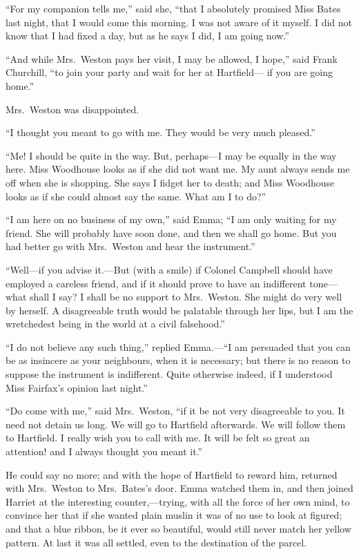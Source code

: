 ``For my companion tells me,'' said she, ``that I absolutely promised
Miss Bates last night, that I would come this morning.  I was
not aware of it myself.  I did not know that I had fixed a day,
but as he says I did, I am going now.''

``And while Mrs.\ Weston pays her visit, I may be allowed, I hope,''
said Frank Churchill, ``to join your party and wait for her at Hartfield---%
if you are going home.''

Mrs.\ Weston was disappointed.

``I thought you meant to go with me.  They would be very much pleased.''

``Me!  I should be quite in the way.  But, perhaps---I may be equally
in the way here.  Miss Woodhouse looks as if she did not want me.
My aunt always sends me off when she is shopping.  She says I fidget
her to death; and Miss Woodhouse looks as if she could almost say
the same.  What am I to do?''

``I am here on no business of my own,'' said Emma; ``I am only waiting
for my friend.  She will probably have soon done, and then we
shall go home.  But you had better go with Mrs.\ Weston and hear
the instrument.''

``Well---if you advise it.---But (with a smile) if Colonel Campbell
should have employed a careless friend, and if it should prove
to have an indifferent tone---what shall I say?  I shall be no
support to Mrs.\ Weston.  She might do very well by herself.
A disagreeable truth would be palatable through her lips, but I
am the wretchedest being in the world at a civil falsehood.''

``I do not believe any such thing,'' replied Emma.---``I am persuaded
that you can be as insincere as your neighbours, when it is necessary;
but there is no reason to suppose the instrument is indifferent.
Quite otherwise indeed, if I understood Miss Fairfax's opinion
last night.''

``Do come with me,'' said Mrs.\ Weston, ``if it be not very disagreeable
to you.  It need not detain us long.  We will go to Hartfield afterwards.
We will follow them to Hartfield.  I really wish you to call with me.
It will be felt so great an attention! and I always thought you
meant it.''

He could say no more; and with the hope of Hartfield to reward him,
returned with Mrs.\ Weston to Mrs.\ Bates's door.  Emma watched them in,
and then joined Harriet at the interesting counter,---trying, with all
the force of her own mind, to convince her that if she wanted plain
muslin it was of no use to look at figured; and that a blue ribbon,
be it ever so beautiful, would still never match her yellow pattern.
At last it was all settled, even to the destination of the parcel.

